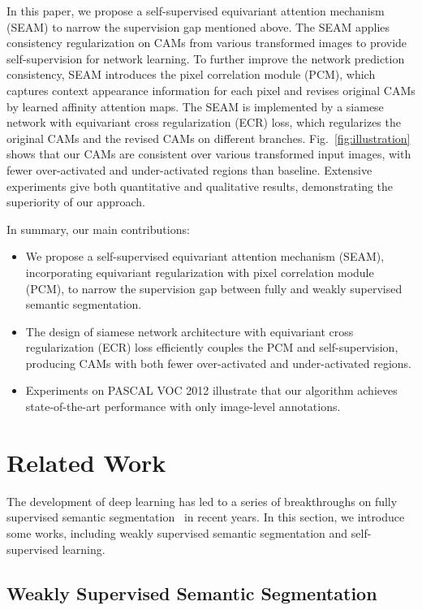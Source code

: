 \documentclass[10pt,twocolumn,letterpaper]{article}
\begin{document}
    In this paper, we propose a self-supervised equivariant attention mechanism (SEAM) to narrow the supervision gap mentioned above. The SEAM applies consistency regularization on CAMs from various transformed images to provide self-supervision for network learning. To further improve the network prediction consistency, SEAM introduces the pixel correlation module (PCM), which captures context appearance information for each pixel and revises original CAMs by learned affinity attention maps. The SEAM is implemented by a siamese network with equivariant cross regularization (ECR) loss, which regularizes the original CAMs and the revised CAMs on different branches. Fig.~\ref{fig:illustration} shows that our CAMs are consistent over various transformed input images, with fewer over-activated and under-activated regions than baseline. Extensive experiments give both quantitative and qualitative results, demonstrating the superiority of our approach.
	
	In summary, our main contributions:
	\begin{itemize}
		\item We propose a self-supervised equivariant attention mechanism (SEAM), incorporating equivariant regularization with pixel correlation module (PCM), to narrow the supervision gap between fully and weakly supervised semantic segmentation.    
		\item The design of siamese network architecture with equivariant cross regularization (ECR) loss efficiently couples the PCM and self-supervision, producing CAMs with both fewer over-activated and under-activated regions.
		\item Experiments on PASCAL VOC 2012 illustrate that our algorithm achieves state-of-the-art performance with only image-level annotations. 
	\end{itemize}
	
	\section{Related Work}
	
	The development of deep learning has led to a series of breakthroughs on fully supervised semantic segmentation~\cite{DeepLabv2, DANet, FCN, OCNet, PSPNet} in recent years. In this section, we introduce some works, including weakly supervised semantic segmentation and self-supervised learning. 
	
	\subsection{Weakly Supervised Semantic Segmentation}
	
\end{document}
